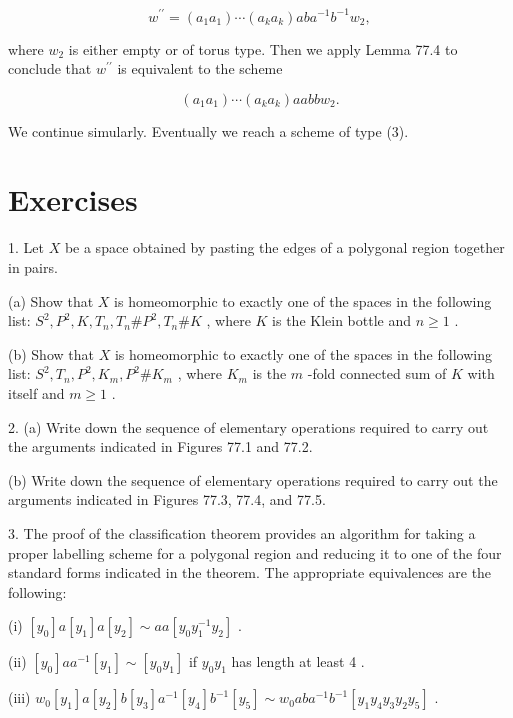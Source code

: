 \[
{w}^{\prime \prime } = \left( {{a}_{1}{a}_{1}}\right) \cdots \left( {{a}_{k}{a}_{k}}\right) {ab}{a}^{-1}{b}^{-1}{w}_{2},
\]

where \({w}_{2}\) is either empty or of torus type. Then we apply Lemma 77.4 to conclude that \({w}^{\prime \prime }\) is equivalent to the scheme

\[
\left( {{a}_{1}{a}_{1}}\right) \cdots \left( {{a}_{k}{a}_{k}}\right) {aabb}{w}_{2}.
\]

We continue simularly. Eventually we reach a scheme of type (3).

\section*{Exercises}

1. Let \(X\) be a space obtained by pasting the edges of a polygonal region together in pairs.

(a) Show that \(X\) is homeomorphic to exactly one of the spaces in the following list: \({S}^{2},{P}^{2},K,{T}_{n},{T}_{n}\# {P}^{2},{T}_{n}\# K\) , where \(K\) is the Klein bottle and \(n \geq  1\) .

(b) Show that \(X\) is homeomorphic to exactly one of the spaces in the following list: \({S}^{2},{T}_{n},{P}^{2},{K}_{m},{P}^{2}\# {K}_{m}\) , where \({K}_{m}\) is the \(m\) -fold connected sum of \(K\) with itself and \(m \geq  1\) .

2. (a) Write down the sequence of elementary operations required to carry out the arguments indicated in Figures 77.1 and 77.2.

(b) Write down the sequence of elementary operations required to carry out the arguments indicated in Figures 77.3, 77.4, and 77.5.

3. The proof of the classification theorem provides an algorithm for taking a proper labelling scheme for a polygonal region and reducing it to one of the four standard forms indicated in the theorem. The appropriate equivalences are the following:

(i) \(\left\lbrack  {y}_{0}\right\rbrack  a\left\lbrack  {y}_{1}\right\rbrack  a\left\lbrack  {y}_{2}\right\rbrack   \sim  {aa}\left\lbrack  {{y}_{0}{y}_{1}^{-1}{y}_{2}}\right\rbrack\) .

(ii) \(\left\lbrack  {y}_{0}\right\rbrack  a{a}^{-1}\left\lbrack  {y}_{1}\right\rbrack   \sim  \left\lbrack  {{y}_{0}{y}_{1}}\right\rbrack\) if \({y}_{0}{y}_{1}\) has length at least 4 .

(iii) \({w}_{0}\left\lbrack  {y}_{1}\right\rbrack  a\left\lbrack  {y}_{2}\right\rbrack  b\left\lbrack  {y}_{3}\right\rbrack  {a}^{-1}\left\lbrack  {y}_{4}\right\rbrack  {b}^{-1}\left\lbrack  {y}_{5}\right\rbrack   \sim  {w}_{0}{ab}{a}^{-1}{b}^{-1}\left\lbrack  {{y}_{1}{y}_{4}{y}_{3}{y}_{2}{y}_{5}}\right\rbrack\) .

